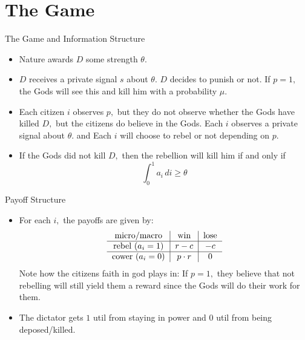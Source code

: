 \documentclass{beamer}
\begin{document}
\section{The Game}
\begin{frame}{The Game and Information Structure}
\begin{itemize}
    \item Nature awards $D$ some strength $\theta.$ 
    \item $D$ receives a private signal $s$ about $\theta.$ $D$ decides to punish or not. If $p = 1,$ the Gods will see this and kill him with a probability $\mu.$
    \item Each citizen $i$ observes $p,$ but they do not observe whether the Gods have killed $D,$ but the citizens do believe in the Gods. Each $i$ observes a private signal about $\theta.$ and Each $i$ will choose to rebel or not depending on $p.$ 
    \item If the Gods did not kill $D,$ then the rebellion will kill him if and only if 
    \[\int_0^1 a_i \,di \geq \theta\]
\end{itemize}
    
\end{frame}

\begin{frame}{Payoff Structure}
\begin{itemize}
    \item For each $i,$ the payoffs are given by:
    \[\begin{tabular}{c|c|c}
            micro/macro & win  & lose\\
             \hline
             rebel ($a_i = 1$)& $r -c$ & $-c$ \\
             \hline
             cower ($a_i = 0$)&  $p \cdot r$& $0$\\
        \end{tabular}\] Note how the citizens faith in god plays in: If $p = 1,$ they believe that not rebelling will still yield them a reward since the Gods will do their work for them. 
    \item The dictator gets $1$ util from staying in power and $0$ util from being deposed/killed.
\end{itemize}
    
\end{frame}

\end{document}
